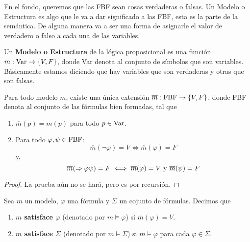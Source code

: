 \documentclass[12pt]{report}
\theoremstyle{largebreak}
\newcommand\cf[3]{\ensuremath{#1:#2\rightarrow#3}}
\begin{document}
    En el fondo, queremos que las FBF sean cosas verdaderas o falsas. Un Modelo o Estructura es algo que le va a dar significado a las FBF, esta es la parte de la semántica. De alguna manera va a ser una forma de asignarle el valor de verdadero o falso a cada una de las variables.

    \begin{mydef}
        Un \textbf{Modelo o Estructura} de la lógica proposicional es una función $\cf{m}{\textup{Var}}{\left\{V,F\right\}}$, donde Var denota al conjunto de símbolos que son variables. Básicamente estamos diciendo que hay variables que son verdaderas y otras que son falsas.
    \end{mydef}

    \begin{theor}
        Para todo modelo $m$, existe una única extensión $\cf{\overline{m}}{\textup{FBF}}{\left\{V,F\right\}}$, donde FBF denota al conjunto de las fórmulas bien formadas, tal que
        \begin{enumerate}
            \item $\overline{m}(p)=m(p)$ para todo $p\in\textup{Var}$.
            \item Para todo $\varphi,\psi\in\textup{FBF}$:
            \begin{equation*}
                \overline{m}(\neg\varphi)=V\iff \overline{m}(\varphi)=F
            \end{equation*}
            y,
            \begin{equation*}
                \overline{m}(\Rightarrow\varphi\psi)=F\iff\overline{m}(\varphi)=V\textup{ y } \overline{m}(\psi)=F
            \end{equation*}
        \end{enumerate}
    \end{theor}

    \begin{proof}
        La prueba aún no se hará, pero es por recursión.
    \end{proof}

    \begin{mydef}
        Sea $m$ un modelo, $\varphi$ una fórmula y $\Sigma$ un cojunto de fórmulas. Decimos que
        \begin{enumerate}
            \item \textbf{$m$ satisface $\varphi$} (denotado por $m\vDash \varphi$) si $\overline{m}(\varphi)=V$.
            \item \textbf{$m$ satisface $\Sigma$} (denotado por $m\vDash \Sigma$) si $m\vDash\varphi$ para cada $\varphi\in\Sigma$.
        \end{enumerate}
    \end{mydef}
\end{document}

